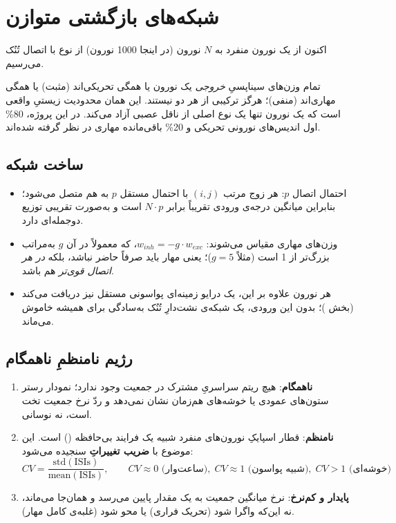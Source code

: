 \documentclass[11pt,a4paper]{article}
\begin{document}
\section{شبکه‌های بازگشتی متوازن}
اکنون از یک نورون منفرد به $N$ نورون
(در اینجا 1000 نورون)
از نوع  با اتصال تُنُک می‌رسیم.

\begin{defbox}
	تمام وزن‌های سیناپسیِ \emph{خروجی} یک نورون یا همگی تحریکی‌اند
	(مثبت)
	یا همگی مهاری‌اند
	(منفی)؛
	هرگز ترکیبی از هر دو نیستند. این همان محدودیت زیستیِ واقعی است که یک نورون تنها یک نوع اصلی از ناقل عصبی آزاد می‌کند. در این پروژه، 80\% اول اندیس‌های نورونی تحریکی و 20\% باقی‌مانده مهاری در نظر گرفته شده‌اند.
\end{defbox}

\subsection{ساخت شبکه}
\begin{itemize}[itemsep=2pt]
	\item احتمال اتصال $p$: هر زوج مرتب $(i,j)$ با احتمال مستقل $p$ به هم متصل می‌شود؛ بنابراین میانگین درجه‌ی ورودی تقریباً برابر $N\!\cdot\!p$ است و به‌صورت تقریبی توزیع دوجمله‌ای دارد.
	\item وزن‌های مهاری مقیاس می‌شوند:
	$w_{inh} = -g \cdot w_{exc}$،
	که معمولاً در آن $g$ به‌مراتب بزرگ‌تر از 1 است
	(مثلاً $g=5$)؛
	یعنی مهار باید صرفاً حاضر نباشد، بلکه \emph{در هر اتصال قوی‌تر} هم باشد.
	\item هر نورون علاوه بر این، یک درایو زمینه‌ای پواسونی مستقل نیز دریافت می‌کند
	(بخش )؛
	بدون این ورودی، یک شبکه‌ی نشت‌دارِ تُنُک به‌سادگی برای همیشه خاموش می‌ماند.
\end{itemize}

\subsection{رژیم نامنظمِ ناهمگام }
\begin{defbox}
	\begin{enumerate}[itemsep=2pt, leftmargin=1.4em]
		\item \textbf{ناهمگام}: هیچ ریتم سراسریِ مشترک در جمعیت وجود ندارد؛ نمودار رستر ستون‌های عمودی یا خوشه‌های هم‌زمان نشان نمی‌دهد و ردّ نرخ جمعیت تخت است، نه نوسانی.
		\item \textbf{نامنظم}: قطار اسپایکِ نورون‌های منفرد شبیه یک فرایند بی‌حافظه
		()
		است. این موضوع با \textbf{ضریب تغییراتِ } سنجیده می‌شود:
		$$CV = \frac{\text{std}(\text{ISIs})}{\text{mean}(\text{ISIs})}, \qquad CV\approx 0 \text{ (ساعت‌وار)}, \; CV\approx 1 \text{ (شبیه پواسون)}, \; CV>1 \text{ (خوشه‌ای)}$$
		\item \textbf{پایدار و کم‌نرخ}: نرخ میانگین جمعیت به یک مقدار پایین می‌رسد و همان‌جا می‌ماند، نه این‌که واگرا شود
		(تحریک فراری)
		یا محو شود
		(غلبه‌ی کامل مهار).
	\end{enumerate}
\end{defbox}
\end{document}
